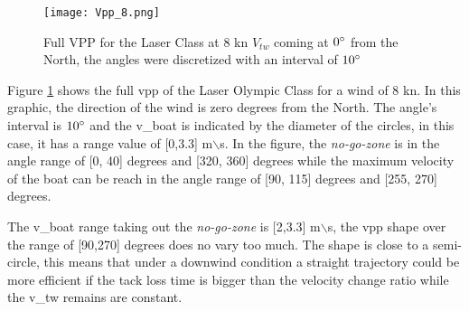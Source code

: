 \par
\begin{figure}[hbt!]
    \centering
    \texttt{[image: Vpp\_8.png]}
    \caption{Full VPP for the Laser Class at 8 kn $V_{tw}$ coming at $0\degree$ from the North, the angles were discretized with an interval of $10\degree$} 
    \label{fig:Laser_Full_Vpp85}
\end{figure}
Figure \ref{fig:Laser_Full_Vpp85} shows the full \acrshort{vpp} of the Laser Olympic Class for a wind of 8 kn. In this graphic, the direction of the wind is zero degrees from the North. The angle's interval is $10\degree$ and the \acrshort{v_boat} is indicated by the diameter of the circles, in this case, it has a range value of [0,3.3] m$\backslash$s. In the figure, the \textit{no-go-zone} is in the angle range of [0, 40] degrees and [320, 360] degrees while the maximum velocity of the boat can be reach in the angle range of [90, 115] degrees and [255, 270] degrees. \par 
\noindent
The \acrshort{v_boat} range taking out the \textit{no-go-zone} is [2,3.3] m$\backslash$s, the \acrshort{vpp} shape over the range of [90,270] degrees does no vary too much. The shape is close to a semi-circle, this means that under a downwind condition a straight trajectory could be more efficient if the tack loss time is bigger than the velocity change ratio while the \acrshort{v_tw} remains are constant.  \par  

